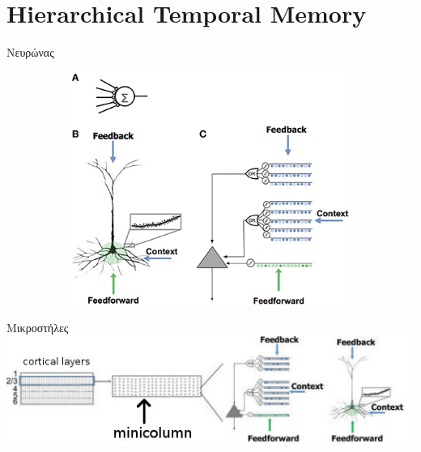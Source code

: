 \documentclass[10pt,lualatex]{beamer}
\title{\huge{\titlestring}}
\author{\authorstring\\
Επιβλέπων καθηγητής: Νίκος Πιτσιάνης}
\date{13 Ιουνίου 2019}
\begin{document}
\begin{frame}%
  \titlepage
\end{frame}

\section{Hierarchical Temporal Memory}

\begin{frame}{Νευρώνας}
  \centering
	\begin{figure}[h]
		\begin{subfigure}{0.30\textwidth}
			
		\end{subfigure}
		\hfill
		\begin{subfigure}{0.65\textwidth}
			\includegraphics[width=\textwidth]{../figures/numenta_neuron}
		\end{subfigure}
	\end{figure}
\end{frame}

\begin{frame}{Μικροστήλες}
  \centering
  \includegraphics[width=\textwidth]{../figures/layer-minicolumn}
\end{frame}
\end{document}
